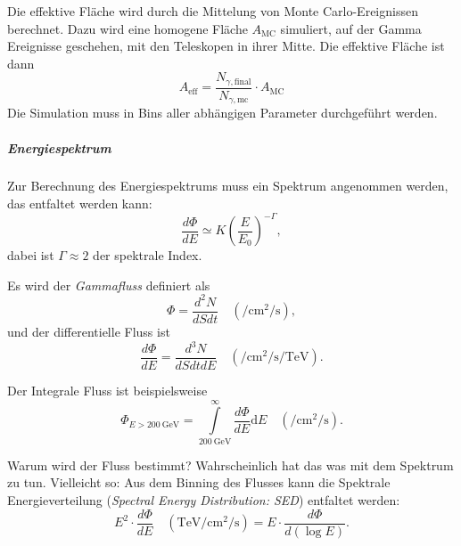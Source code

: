 Die effektive Fläche wird durch die Mittelung von Monte Carlo-Ereignissen
berechnet.
Dazu wird eine homogene Fläche $A_{\text{MC}}$ simuliert,
auf der Gamma Ereignisse geschehen,
mit den Teleskopen in ihrer Mitte.
Die effektive Fläche ist dann
\begin{equation}%
  \label{eq:effective_area}
  A_{\text{eff}} =
    \frac{N_{\gamma,\text{final}}}{N_{\gamma,\text{mc}}}
    \cdot A_{\text{MC}}
\end{equation}
Die Simulation muss in Bins aller abhängigen Parameter durchgeführt werden.



\subparagraph{Energiespektrum}

Zur Berechnung des Energiespektrums muss ein Spektrum angenommen werden,
das entfaltet werden kann:
\begin{equation}%
  \label{eq:photon_index}
  \frac{d\Phi}{dE} \simeq K {\left(\frac{E}{E_0}\right)}^{-\Gamma},
\end{equation}
dabei ist $\Gamma \approx 2$ der spektrale Index.

Es wird der \textit{Gammafluss} definiert als
\begin{equation}%
  \label{eq:gamma_flux}
  \Phi = \frac{d^2 N}{dS dt}
  \quad \left(\si{\per\centi\meter\tothe2\per\second}\right),
\end{equation}
und der differentielle Fluss ist
\begin{equation}%
  \label{eq:differential_energy_spectrum}
  \frac{d\Phi}{dE} = \frac{d^3N}{dS dt dE}
  \quad \left(\si{\per\centi\meter\tothe2\per\second\per\tera\electronvolt}\right).
\end{equation}

Der Integrale Fluss ist beispielsweise
\begin{equation}%
  \label{eq:integral_flux}
  \Phi_{E > \SI{200}{\giga\electronvolt}} =
    \int\limits_{\SI{200}{\giga\electronvolt}}^{\infty} \frac{d \Phi}{dE}
    \text{d} E
  \quad \left(\si{\per\centi\meter\tothe2\per\second}\right).
\end{equation}

{\color{red} Warum wird der Fluss bestimmt? Wahrscheinlich hat das was mit dem
Spektrum zu tun. Vielleicht so:}
Aus dem Binning des Flusses kann die Spektrale Energieverteilung
(\textit{Spectral Energy Distribution: SED}) entfaltet werden:
\begin{equation}%
  \label{eq:spectral_energy_distribution}
  E^2 \cdot \frac{d \Phi}{dE}
  \quad \left(\si{\tera\electronvolt\per\centi\meter\tothe2\per\second}\right)
  = E \cdot \frac{d \Phi}{d \left(\log E\right)}.
\end{equation}

